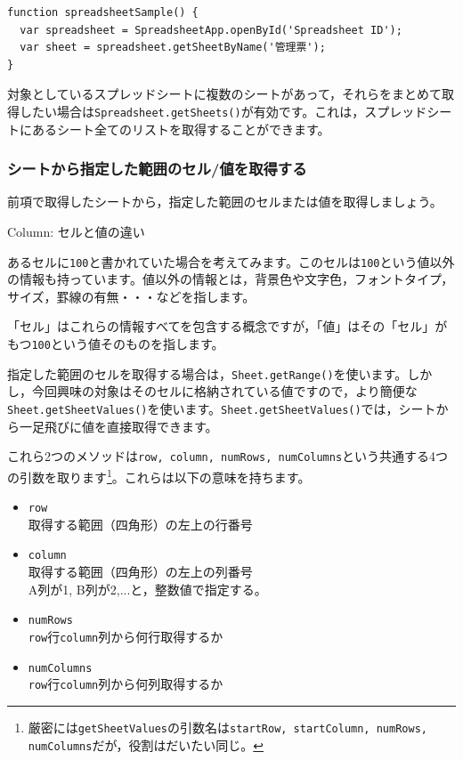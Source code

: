 \documentclass[uplatex,a4j]{jsarticle}
\begin{document}
\begin{lstlisting}[basicstyle=\ttfamily\footnotesize,frame=single,caption=SpreadsheetApp sample 3]
function spreadsheetSample() {
  var spreadsheet = SpreadsheetApp.openById('Spreadsheet ID');
  var sheet = spreadsheet.getSheetByName('管理票');
}
\end{lstlisting}

対象としているスプレッドシートに複数のシートがあって，それらをまとめて取得したい場合は\verb|Spreadsheet.getSheets()|が有効です。これは，スプレッドシートにあるシート全てのリストを取得することができます。

\subsubsection{シートから指定した範囲のセル/値を取得する}
\label{subsec:get_range}


前項で取得したシートから，指定した範囲のセルまたは値を取得しましょう。

\begin{itembox}[l]{Column: セルと値の違い}

あるセルに\verb|100|と書かれていた場合を考えてみます。このセルは\verb|100|という値以外の情報も持っています。値以外の情報とは，背景色や文字色，フォントタイプ，サイズ，罫線の有無・・・などを指します。


「セル」はこれらの情報すべてを包含する概念ですが，「値」はその「セル」がもつ\verb|100|という値そのものを指します。

\end{itembox}

指定した範囲のセルを取得する場合は，\verb|Sheet.getRange()|を使います。しかし，今回興味の対象はそのセルに格納されている値ですので，より簡便な\verb|Sheet.getSheetValues()|を使います。\verb|Sheet.getSheetValues()|では，シートから一足飛びに値を直接取得できます。

これら2つのメソッドは\verb|row, column, numRows, numColumns|という共通する4つの引数を取ります\footnote{厳密には\verb|getSheetValues|の引数名は\verb|startRow, startColumn, numRows, numColumns|だが，役割はだいたい同じ。}。これらは以下の意味を持ちます。

\begin{itemize}
\item \verb|row|\\
取得する範囲（四角形）の左上の行番号
\item \verb|column|\\
取得する範囲（四角形）の左上の列番号\\
A列が1, B列が2,...と，整数値で指定する。
\item \verb|numRows|\\
\verb|row|行\verb|column|列から何行取得するか
\item \verb|numColumns|\\
\verb|row|行\verb|column|列から何列取得するか
\end{itemize}
\end{document}
